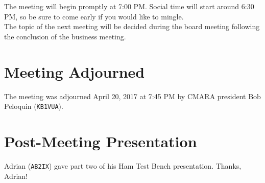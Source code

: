\documentclass[10pt,letterpaper]{article}
\begin{document}
\noindent
The meeting will begin promptly at 7:00 PM. Social time will start around 6:30 PM, so be sure to come early if you would like to mingle.\\

\noindent
The topic of the next meeting will be decided during the board meeting following the conclusion of the business meeting.

\section{Meeting Adjourned}
The meeting was adjourned April 20, 2017 at 7:45 PM by CMARA president Bob Peloquin (\texttt{KB1VUA}).

\section{Post-Meeting Presentation}

Adrian (\texttt{AB2IX}) gave part two of his Ham Test Bench presentation. Thanks, Adrian!
\end{document}
